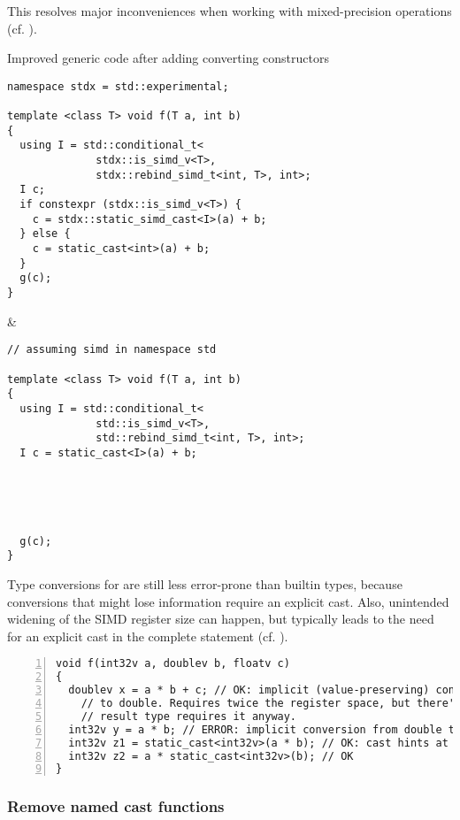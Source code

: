 This resolves major inconveniences when working with mixed-precision
operations (cf. ).
\begin{tonytable}{Improved generic code after adding converting constructors}\label{tt:better with conv ctors}
  \begin{lstlisting}
namespace stdx = std::experimental;

template <class T> void f(T a, int b)
{
  using I = std::conditional_t<
              stdx::is_simd_v<T>,
              stdx::rebind_simd_t<int, T>, int>;
  I c;
  if constexpr (stdx::is_simd_v<T>) {
    c = stdx::static_simd_cast<I>(a) + b;
  } else {
    c = static_cast<int>(a) + b;
  }
  g(c);
}
  \end{lstlisting}
  &
  \begin{lstlisting}
// assuming simd in namespace std

template <class T> void f(T a, int b)
{
  using I = std::conditional_t<
              std::is_simd_v<T>,
              std::rebind_simd_t<int, T>, int>;
  I c = static_cast<I>(a) + b;





  g(c);
}
  \end{lstlisting}
\end{tonytable}%
Type conversions for  are still less error-prone than builtin types,
because conversions that might lose information require an explicit cast.
Also, unintended widening of the SIMD register size can happen, but typically
leads to the need for an explicit cast in the complete statement (cf.
).

\begin{lstlisting}[numbers=left,float={hbtp},label=lst:mixedprecision,caption={
  Mixed precision code using the types from \lst{lst:simdtypespattern}, ensuring equal element count
}]
void f(int32v a, doublev b, floatv c)
{
  doublev x = a * b + c; // OK: implicit (value-preserving) conversion from int and float
    // to double. Requires twice the register space, but there's no way around it and the
    // result type requires it anyway.
  int32v y = a * b; // ERROR: implicit conversion from double to int not value-preserving
  int32v z1 = static_cast<int32v>(a * b); // OK: cast hints at implicit register widening
  int32v z2 = a * static_cast<int32v>(b); // OK
}
\end{lstlisting}

\subsubsection{Remove named cast functions}

